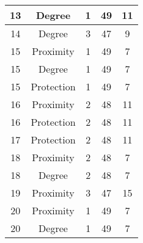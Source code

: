 \documentclass[results.tex]{subfiles}
\begin{document}
\begin{center}
\begin{tabular}{| c || c | c | c | c |}
            \hline
            13                      & Degree                       & 1                      & 49                      & 11                   \\
            \hline
            14                      & Degree                       & 3                      & 47                      & 9                    \\
            \hline
            15                      & Proximity                    & 1                      & 49                      & 7                    \\
            \hline
            15                      & Degree                       & 1                      & 49                      & 7                    \\
            \hline
            15                      & Protection                   & 1                      & 49                      & 7                    \\
            \hline
            16                      & Proximity                    & 2                      & 48                      & 11                   \\
            \hline
            16                      & Protection                   & 2                      & 48                      & 11                   \\
            \hline
            17                      & Protection                   & 2                      & 48                      & 11                   \\
            \hline
            18                      & Proximity                    & 2                      & 48                      & 7                    \\
            \hline
            18                      & Degree                       & 2                      & 48                      & 7                    \\
            \hline
            19                      & Proximity                    & 3                      & 47                      & 15                   \\
            \hline
            20                      & Proximity                    & 1                      & 49                      & 7                    \\
            \hline
            20                      & Degree                       & 1                      & 49                      & 7                    \\

\end{tabular}
\end{center}
\end{document}
